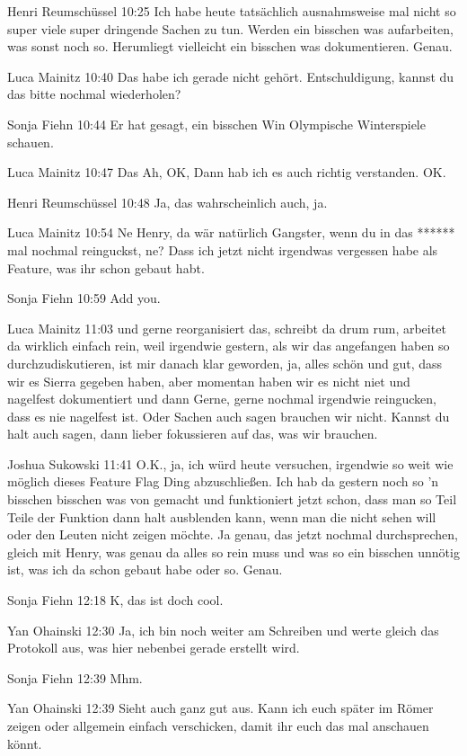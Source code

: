 Henri Reumschüssel   10:25
Ich habe heute tatsächlich ausnahmsweise mal nicht so super viele super dringende Sachen zu tun.
Werden ein bisschen was aufarbeiten, was sonst noch so.
Herumliegt vielleicht ein bisschen was dokumentieren.
Genau.

Luca Mainitz   10:40
Das habe ich gerade nicht gehört. Entschuldigung, kannst du das bitte nochmal wiederholen?

Sonja Fiehn   10:44
Er hat gesagt, ein bisschen Win Olympische Winterspiele schauen.

Luca Mainitz   10:47
Das Ah, OK, Dann hab ich es auch richtig verstanden. OK.

Henri Reumschüssel   10:48
Ja, das wahrscheinlich auch, ja.

Luca Mainitz   10:54
Ne Henry, da wär natürlich Gangster, wenn du in das ****** mal nochmal reinguckst, ne?
Dass ich jetzt nicht irgendwas vergessen habe als Feature, was ihr schon gebaut habt.

Sonja Fiehn   10:59
Add you.

Luca Mainitz   11:03
und gerne reorganisiert das, schreibt da drum rum, arbeitet da wirklich einfach rein, weil irgendwie gestern, als wir das angefangen haben so durchzudiskutieren, ist mir danach klar geworden, ja, alles schön und gut, dass wir es Sierra gegeben haben, aber momentan haben wir es nicht niet und nagelfest dokumentiert und dann
Gerne, gerne nochmal irgendwie reingucken, dass es nie nagelfest ist.
Oder Sachen auch sagen brauchen wir nicht. Kannst du halt auch sagen, dann lieber fokussieren auf das, was wir brauchen.

Joshua Sukowski   11:41
O.K., ja, ich würd heute versuchen, irgendwie so weit wie möglich dieses Feature Flag Ding abzuschließen. Ich hab da gestern noch so 'n bisschen bisschen was von gemacht und funktioniert jetzt schon, dass man so
Teil Teile der Funktion dann halt ausblenden kann, wenn man die nicht sehen will oder den Leuten nicht zeigen möchte. Ja genau, das jetzt nochmal durchsprechen, gleich mit Henry, was genau da alles so rein muss und was so ein bisschen unnötig ist, was ich da schon gebaut habe oder so.
Genau.

Sonja Fiehn   12:18
K, das ist doch cool.

Yan Ohainski   12:30
Ja, ich bin noch weiter am Schreiben und werte gleich das Protokoll aus, was hier nebenbei gerade erstellt wird.

Sonja Fiehn   12:39
Mhm.

Yan Ohainski   12:39
Sieht auch ganz gut aus. Kann ich euch später im Römer zeigen oder allgemein einfach verschicken, damit ihr euch das mal anschauen könnt.

